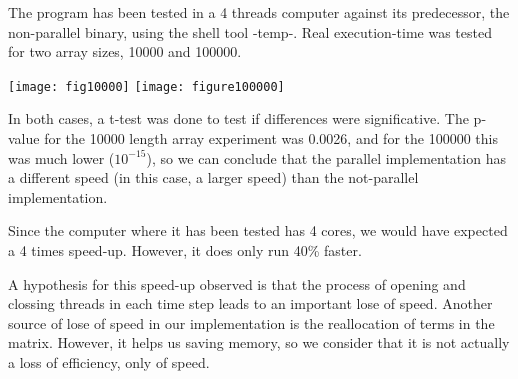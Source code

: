 \documentclass{article}
\begin{document}
	The program has been tested in a 4 threads computer against its predecessor,
	the non-parallel binary, using the shell tool -temp-. Real execution-time
	was tested for two array sizes, 10000 and 100000.

	\texttt{[image: fig10000]}
	\texttt{[image: figure100000]}

	In both cases, a t-test was done to test if differences were significative.
	The p-value for the 10000 length array experiment was 0.0026, and for the
	100000 this was much lower ($10^{-15}$), so we can conclude that
	the parallel implementation has a different speed (in this case, a
	larger speed) than the not-parallel implementation.

	Since the computer where it has been tested has 4 cores, we would have
	expected a 4 times speed-up. However, it does only run 40\% faster.

	A hypothesis for this speed-up observed is that the process of opening and
	clossing threads in each time step leads to an important lose of
	speed. Another source of lose of speed in our implementation is the
	reallocation of terms in the matrix. However, it helps us saving memory,
	so we consider that it is not actually a loss of efficiency, only of speed.
\end{document}
